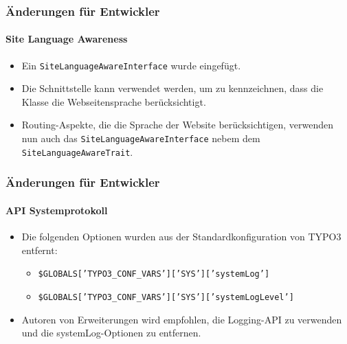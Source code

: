 
\begin{frame}[fragile]
	\frametitle{Änderungen für Entwickler}
	\framesubtitle{Site Language Awareness}

	\lstset{basicstyle=\tiny\ttfamily}


	\begin{itemize}
		\item Ein \texttt{SiteLanguageAwareInterface} wurde eingefügt.
		\item Die Schnittstelle kann verwendet werden, um zu kennzeichnen, dass die Klasse die Webseitensprache berücksichtigt.
		\item Routing-Aspekte, die die Sprache der Website berücksichtigen, verwenden nun auch das
			\texttt{SiteLanguageAwareInterface}
			nebem dem \texttt{SiteLanguageAwareTrait}.
	\end{itemize}

\end{frame}


\begin{frame}[fragile]
	\frametitle{Änderungen für Entwickler}
	\framesubtitle{API Systemprotokoll}

	\lstset{basicstyle=\tiny\ttfamily}

	\begin{itemize}
		\item Die folgenden Optionen wurden aus der Standardkonfiguration von TYPO3 entfernt:

			\begin{itemize}\smaller
				\item \texttt{\$GLOBALS['TYPO3\_CONF\_VARS']['SYS']['systemLog']}
				\item \texttt{\$GLOBALS['TYPO3\_CONF\_VARS']['SYS']['systemLogLevel']}
			\end{itemize}\normalsize

		\item Autoren von Erweiterungen wird empfohlen, die Logging-API zu verwenden und die systemLog-Optionen zu entfernen.
	\end{itemize}

\end{frame}

